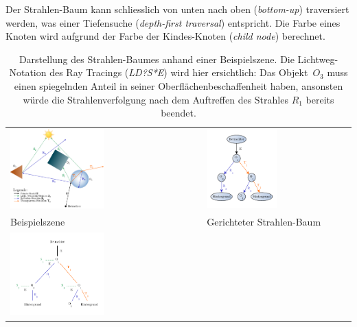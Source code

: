 Der Strahlen-Baum kann schliesslich von unten nach oben
(\textit{bottom-up}) traversiert werden, was einer Tiefensuche
(\textit{depth-first traversal}) entspricht. Die Farbe eines Knoten wird aufgrund
der Farbe der Kindes-Knoten (\textit{child node}) berechnet.

\begin{table}[H]
    \centering
    \caption{Darstellung des Strahlen-Baumes anhand einer Beispielszene.
        Die Lichtweg-Notation des Ray Tracings (\textit{LD?S*E}) wird hier
        ersichtlich: Das Objekt~\textit{$O_{3}$} muss einen spiegelnden Anteil
        in seiner Oberflächenbeschaffenheit haben, ansonsten würde die Strahlenverfolgung nach
        dem Auftreffen des Strahles $R_{1}$ bereits
        beendet.}\label{table:ray_tracing:ray_tree}
    \begin{tabular}{p{}p{}}
        \toprule
            \includegraphics[width=0.5\textwidth]{img/ray_tracing_scene_ray_tree.pdf} &
            \includegraphics[width=0.5\textwidth]{img/ray_tracing_tree.pdf} \\
            Beispielszene &
            Gerichteter Strahlen-Baum \\
            \includegraphics[width=0.5\textwidth]{img/ray_tracing_tree_schematic.pdf} \\

\end{tabular}
\end{table}
